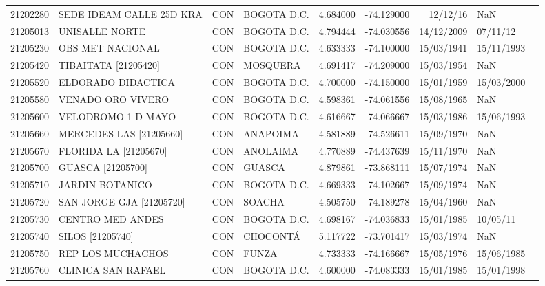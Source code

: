 \begin{landscape}
\begin{longtable}{lp{4cm}lp{3cm}lrrll}
   21202280 &    SEDE IDEAM CALLE 25D KRA &  CON &       BOGOTA D.C. &  4.684000 & -74.129000 &    12/12/16 &         NaN \\
   21205013 &              UNISALLE NORTE &  CON &       BOGOTA D.C. &  4.794444 & -74.030556 &  14/12/2009 &    07/11/12 \\
   21205230 &            OBS MET NACIONAL &  CON &       BOGOTA D.C. &  4.633333 & -74.100000 &  15/03/1941 &  15/11/1993 \\
   21205420 &        TIBAITATA [21205420] &  CON &          MOSQUERA &  4.691417 & -74.209000 &  15/03/1954 &         NaN \\
   21205520 &          ELDORADO DIDACTICA &  CON &       BOGOTA D.C. &  4.700000 & -74.150000 &  15/01/1959 &  15/03/2000 \\
   21205580 &           VENADO ORO VIVERO &  CON &       BOGOTA D.C. &  4.598361 & -74.061556 &  15/08/1965 &         NaN \\
   21205600 &          VELODROMO 1 D MAYO &  CON &       BOGOTA D.C. &  4.616667 & -74.066667 &  15/03/1986 &  15/06/1993 \\
   21205660 &     MERCEDES LAS [21205660] &  CON &          ANAPOIMA &  4.581889 & -74.526611 &  15/09/1970 &         NaN \\
   21205670 &       FLORIDA LA [21205670] &  CON &          ANOLAIMA &  4.770889 & -74.437639 &  15/11/1970 &         NaN \\
   21205700 &           GUASCA [21205700] &  CON &            GUASCA &  4.879861 & -73.868111 &  15/07/1974 &         NaN \\
   21205710 &             JARDIN BOTANICO &  CON &       BOGOTA D.C. &  4.669333 & -74.102667 &  15/09/1974 &         NaN \\
   21205720 &    SAN JORGE GJA [21205720] &  CON &            SOACHA &  4.505750 & -74.189278 &  15/04/1960 &         NaN \\
   21205730 &            CENTRO MED ANDES &  CON &       BOGOTA D.C. &  4.698167 & -74.036833 &  15/01/1985 &    10/05/11 \\
   21205740 &            SILOS [21205740] &  CON &          CHOCONTÁ &  5.117722 & -73.701417 &  15/03/1974 &         NaN \\
   21205750 &           REP LOS MUCHACHOS &  CON &             FUNZA &  4.733333 & -74.166667 &  15/05/1976 &  15/06/1985 \\
   21205760 &          CLINICA SAN RAFAEL &  CON &       BOGOTA D.C. &  4.600000 & -74.083333 &  15/01/1985 &  15/01/1998 \\

\end{longtable}
\end{landscape}
